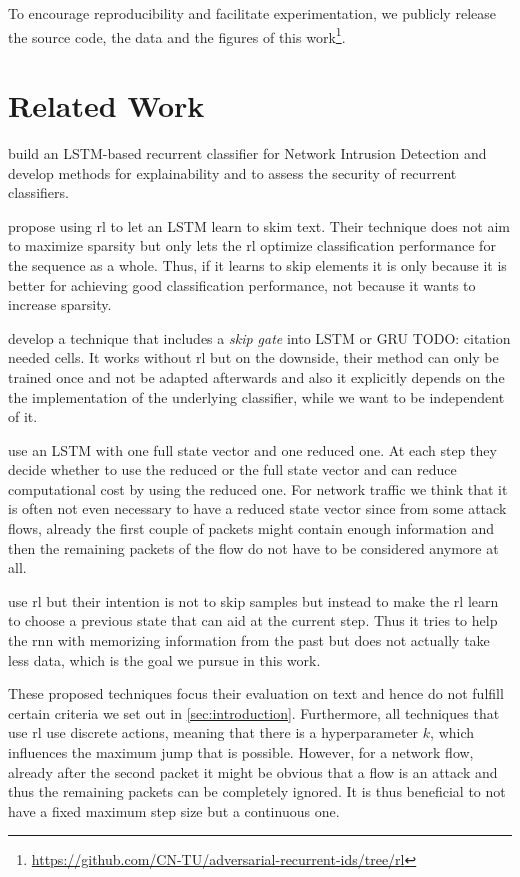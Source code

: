 \documentclass[conference]{IEEEtran}
\newcommand\note[2]{{\color{#1}#2}}
\newcommand\todo[1]{{\note{red}{TODO: #1}}}
\begin{document}
To encourage reproducibility and facilitate experimentation, we publicly release the source code, the data and the figures of this work\footnote{\url{https://github.com/CN-TU/adversarial-recurrent-ids/tree/rl}}.

\section{Related Work}

\cite{hartl_explainability_2019} build an LSTM-based recurrent classifier for Network Intrusion Detection and develop methods for explainability and to assess the security of recurrent classifiers.

\cite{yu_learning_2017} propose using \gls{rl} to let an LSTM learn to skim text. Their technique does not aim to maximize sparsity but only lets the \gls{rl} optimize classification performance for the sequence as a whole. Thus, if it learns to skip elements it is only because it is better for achieving good classification performance, not because it wants to increase sparsity.

\cite{campos_skip_2018} develop a technique that includes a \textit{skip gate} into LSTM or GRU \todo{citation needed} cells. It works without \gls{rl} but on the downside, their method can only be trained once and not be adapted afterwards and also it explicitly depends on the the implementation of the underlying classifier, while we want to be independent of it.

\cite{seo_neural_2018} use an LSTM with one full state vector and one reduced one. At each step they decide whether to use the reduced or the full state vector and can reduce computational cost by using the reduced one. For network traffic we think that it is often not even necessary to have a reduced state vector since from some attack flows, already the first couple of packets might contain enough information and then the remaining packets of the flow do not have to be considered anymore at all.

\cite{gui_long_2018} use \gls{rl} but their intention is not to skip samples but instead to make the \gls{rl} learn to choose a previous state that can aid at the current step. Thus it tries to help the \gls{rnn} with memorizing information from the past but does not actually take less data, which is the goal we pursue in this work.

These proposed techniques focus their evaluation on text and hence do not fulfill certain criteria we set out in \autoref{sec:introduction}. Furthermore, all techniques that use \gls{rl} use discrete actions, meaning that there is a hyperparameter $k$, which influences the maximum jump that is possible. However, for a network flow, already after the second packet it might be obvious that a flow is an attack and thus the remaining packets can be completely ignored. It is thus beneficial to not have a fixed maximum step size but a continuous one.
\end{document}
